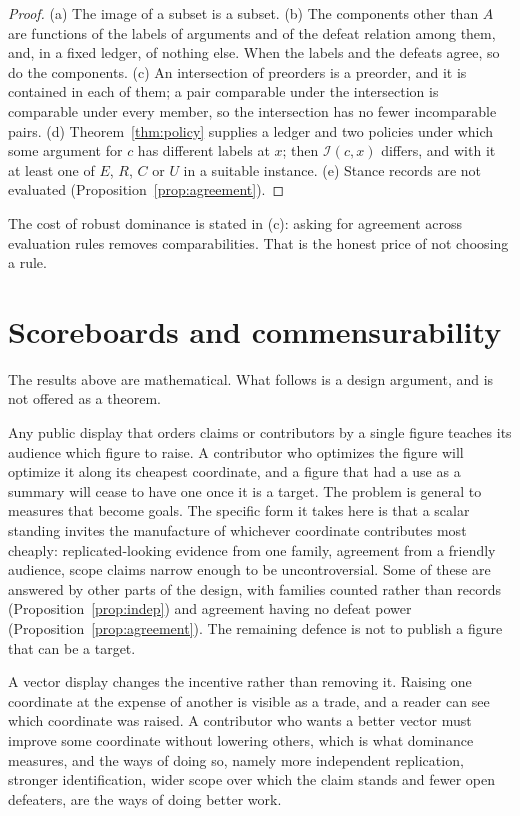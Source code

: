 \begin{proof}
(a) The image of a subset is a subset. (b) The components other than $A$ are functions of the labels of arguments and of the defeat relation among them, and, in a fixed ledger, of nothing else. When the labels and the defeats agree, so do the components. (c) An intersection of preorders is a preorder, and it is contained in each of them; a pair comparable under the intersection is comparable under every member, so the intersection has no fewer incomparable pairs. (d) Theorem~\ref{thm:policy} supplies a ledger and two policies under which some argument for $c$ has different labels at $x$; then $\mathcal I(c,x)$ differs, and with it at least one of $E$, $R$, $C$ or $U$ in a suitable instance. (e) Stance records are not evaluated (Proposition~\ref{prop:agreement}).
\end{proof}

The cost of robust dominance is stated in (c): asking for agreement across evaluation rules removes comparabilities. That is the honest price of not choosing a rule.

\section{Scoreboards and commensurability}\label{sec:scoreboard}

The results above are mathematical. What follows is a design argument, and is not offered as a theorem.

Any public display that orders claims or contributors by a single figure teaches its audience which figure to raise. A contributor who optimizes the figure will optimize it along its cheapest coordinate, and a figure that had a use as a summary will cease to have one once it is a target. The problem is general to measures that become goals. The specific form it takes here is that a scalar standing invites the manufacture of whichever coordinate contributes most cheaply: replicated-looking evidence from one family, agreement from a friendly audience, scope claims narrow enough to be uncontroversial. Some of these are answered by other parts of the design, with families counted rather than records (Proposition~\ref{prop:indep}) and agreement having no defeat power (Proposition~\ref{prop:agreement}). The remaining defence is not to publish a figure that can be a target.

A vector display changes the incentive rather than removing it. Raising one coordinate at the expense of another is visible as a trade, and a reader can see which coordinate was raised. A contributor who wants a better vector must improve some coordinate without lowering others, which is what dominance measures, and the ways of doing so, namely more independent replication, stronger identification, wider scope over which the claim stands and fewer open defeaters, are the ways of doing better work.

